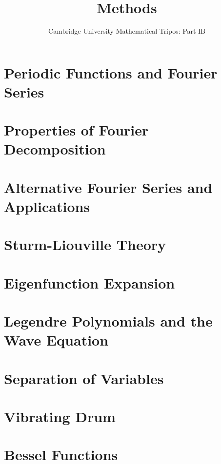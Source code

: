 \documentclass{article}
\title{Methods}
\author{Cambridge University Mathematical Tripos: Part IB}
\begin{document}
\maketitle

\tableofcontentsnewpage{}

\section{Periodic Functions and Fourier Series}

\section{Properties of Fourier Decomposition}

\section{Alternative Fourier Series and Applications}

\section{Sturm-Liouville Theory}

\section{Eigenfunction Expansion}

\section{Legendre Polynomials and the Wave Equation}

\section{Separation of Variables}

\section{Vibrating Drum}

\section{Bessel Functions}

\end{document}
